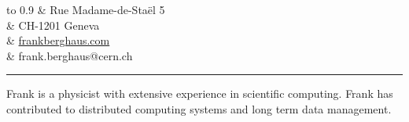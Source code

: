 \documentclass[12pt,a4paper]{article}
\newcommand{\colorrule}[1]
{
  {\color{#1}\hrule height 2pt}
  \vspace{1.0em}
}
\begin{document}
\begin{center}
	\begin{tabu} to 0.9\textwidth {X[l] X[r]}
		                                      & {\small Rue Madame-de-Staël 5} \\
																          & {\small CH-1201 Geneva} \\
																          & \href{http://www.frankberghaus.com}{\small frankberghaus.com} \\
	                                    		& {\small frank.berghaus@cern.ch} \\
	\end{tabu}
\end{center}
\colorrule{NavyBlue}
Frank is a physicist with extensive experience in scientific computing. Frank has contributed to distributed computing
systems and long term data management.
\end{document}
